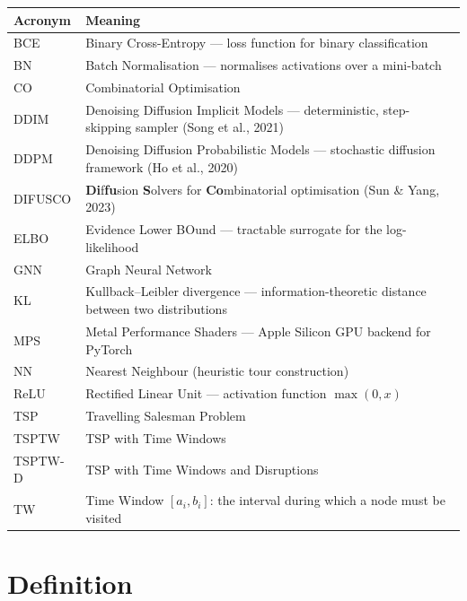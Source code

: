 \documentclass[12pt,a4paper]{article}
\begin{document}
\begin{center}
\begin{tabular}{@{}lp{11cm}@{}}
\toprule
\textbf{Acronym} & \textbf{Meaning} \\
\midrule
BCE     & Binary Cross-Entropy --- loss function for binary classification \\
BN      & Batch Normalisation --- normalises activations over a mini-batch \\
CO      & Combinatorial Optimisation \\
DDIM    & Denoising Diffusion Implicit Models --- deterministic, step-skipping sampler (Song et al., 2021) \\
DDPM    & Denoising Diffusion Probabilistic Models --- stochastic diffusion framework (Ho et al., 2020) \\
DIFUSCO & \textbf{Di}f\textbf{fu}sion \textbf{S}olvers for \textbf{Co}mbinatorial optimisation (Sun \& Yang, 2023) \\
ELBO    & Evidence Lower BOund --- tractable surrogate for the log-likelihood \\
GNN     & Graph Neural Network \\
KL      & Kullback--Leibler divergence --- information-theoretic distance between two distributions \\
MPS     & Metal Performance Shaders --- Apple Silicon GPU backend for PyTorch \\
NN      & Nearest Neighbour (heuristic tour construction) \\
ReLU    & Rectified Linear Unit --- activation function $\max(0,x)$ \\
TSP     & Travelling Salesman Problem \\
TSPTW   & TSP with Time Windows \\
TSPTW-D & TSP with Time Windows and Disruptions \\
TW      & Time Window $[a_i, b_i]$: the interval during which a node must be visited \\
\bottomrule
\end{tabular}
\end{center}

\newpage

\section{Definition}
\end{document}
